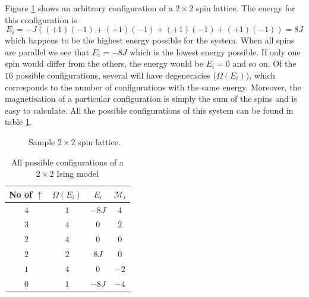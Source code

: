 \documentclass[10pt,a4paper]{amsart}
\begin{document}
Figure \ref{fig:2by2lattice} shows an arbitrary configuration of a $2\times2$ spin lattice. The energy for this configuration is
\begin{equation*}
E_i = -J((+1)(-1)+(+1)(-1)+(+1)(-1)+(+1)(-1)) = 8J
\end{equation*}
which happens to be the highest energy possible for the system. When all spins are parallel we see that $E_i=-8J$ which is the lowest energy possible. If only one spin would differ from the others, the energy would be $E_i = 0$ and so on. Of the $16$ possible configurations, several will have degeneracies ($\Omega(E_i)$), which corresponds to the number of configurations with the same energy. Moreover, the magnetisation of a particular configuration is simply the sum of the spins and is easy to calculate. All the possible configurations of this system can be found in table \ref{tab:2by2lattice}.

\begin{figure}[h]
	\centering
	\caption{Sample $2\times2$ spin lattice.}
	\label{fig:2by2lattice}
\end{figure}

\begin{table}
	\centering
	\caption{All possible configurations of a $2\times2$ Ising model}
	\begin{tabular}{cccc} \hline
	No of $\uparrow$ & $\Omega(E_i)$ & $E_i$ & $\mathcal{M}_i$ \\ \hline
	$4$ & $1$ & $-8J$ & $4$  \\
	$3$ & $4$ & $0$   & $2$ \\
	$2$ & $4$ & $0$   & $0$  \\
	$2$ & $2$ & $8J$  & $0$  \\
	$1$ & $4$ & $0$   & $-2$ \\
	$0$ & $1$ & $-8J$ & $-4$ \\ \hline
	\end{tabular}
	\label{tab:2by2lattice}
\end{table}
\end{document}
